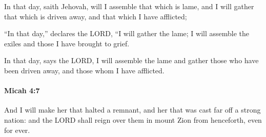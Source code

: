 			\begin{versebox}
					\item[BHS] 
					\item[LXX] 
					\item[ASV] In that day, saith Jehovah, will I assemble that which is lame, and I will gather that which is driven away, and that which I have afflicted;
					\item[NIV] “In that day,” declares the LORD, “I will gather the lame; I will assemble the exiles and those I have brought to grief.
					\item[NRSV] In that day, says the LORD, I will assemble the lame and gather those who have been driven away, and those whom I have afflicted.
			\end{versebox}

		\paragraph{Micah 4:7} %
			\label{MICAH-4-7}

			And I will make her that halted a remnant, and her that was cast far off a strong nation: and the LORD shall reign over them in mount Zion from henceforth, even for ever.

